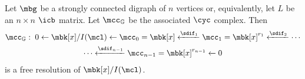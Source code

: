 \begin{theorem}\label{main}
Let $\mbg$ be a strongly connected digraph of $n$ vertices or,
equivalently, let $L$ be an $n\times n$ $\icb$ matrix. Let
$\mcc_{\mathbb{G}}$ be the associated $\cyc$ complex. Then
\begin{multline*}
\mcc_{\mathbb{G}}:\; 0\leftarrow \mbk[x]/I(\mcl)\leftarrow
\mcc_0=\mbk[x]\xleftarrow{\sdif_1} \mcc_1=\mbk[x]^{r_1}
\xleftarrow{\sdif_2} \cdots \\ \cdots
\xleftarrow{\sdif_{n-1}}\mcc_{n-1}=\mbk[x]^{r_{n-1}}\xleftarrow{} 0
\end{multline*}
is a free resolution of $\mbk[x]/I(\mcl)$.
\end{theorem}
